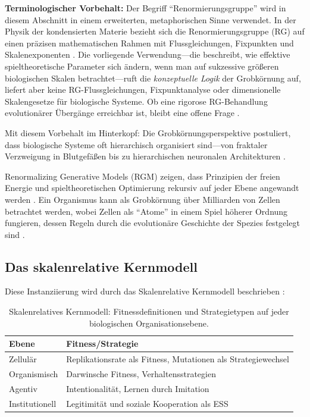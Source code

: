 \documentclass[12pt,a4paper]{article}
\theoremstyle{remark}
\begin{document}
\textbf{Terminologischer Vorbehalt:} Der Begriff ``Renormierungsgruppe'' wird in diesem Abschnitt in einem erweiterten, metaphorischen Sinne verwendet. In der Physik der kondensierten Materie bezieht sich die Renormierungsgruppe (RG) auf einen pr\"azisen mathematischen Rahmen mit Flussgleichungen, Fixpunkten und Skalenexponenten \citep{ScaleRGResearch}. Die vorliegende Verwendung---die beschreibt, wie effektive spieltheoretische Parameter sich \"andern, wenn man auf sukzessive gr\"o\ss{}eren biologischen Skalen betrachtet---ruft die \emph{konzeptuelle Logik} der Grobk\"ornung auf, liefert aber keine RG-Flussgleichungen, Fixpunktanalyse oder dimensionelle Skalengesetze f\"ur biologische Systeme. Ob eine rigorose RG-Behandlung evolution\"arer \"Uberg\"ange erreichbar ist, bleibt eine offene Frage \citep{ScaleRGFrontiers}.

Mit diesem Vorbehalt im Hinterkopf: Die Grobk\"ornungsperspektive postuliert, dass biologische Systeme oft hierarchisch organisiert sind---von fraktaler Verzweigung in Blutgef\"a\ss{}en bis zu hierarchischen neuronalen Architekturen \citep{SelfSimilarNetworks}.

Renormalizing Generative Models (RGM) zeigen, dass Prinzipien der freien Energie und spieltheoretischen Optimierung rekursiv auf jeder Ebene angewandt werden \citep{ScaleRGFrontiers}. Ein Organismus kann als Grobk\"ornung \"uber Milliarden von Zellen betrachtet werden, wobei Zellen als ``Atome'' in einem Spiel h\"oherer Ordnung fungieren, dessen Regeln durch die evolution\"are Geschichte der Spezies festgelegt sind \citep{ReplicatorOptimization}.

\subsection{Das skalenrelative Kernmodell}

Diese Instanziierung wird durch das Skalenrelative Kernmodell beschrieben \citep{ReplicatorOptimization}:

\begin{table}[htbp]
\centering
\caption{Skalenrelatives Kernmodell: Fitnessdefinitionen und Strategietypen auf jeder biologischen Organisationsebene.}
\label{tab:scale-kernel}
\begin{tabular}{ll}
\toprule
\textbf{Ebene} & \textbf{Fitness/Strategie} \\
\midrule
Zellul\"ar & Replikationsrate als Fitness, Mutationen als Strategiewechsel \\
Organismisch & Darwinsche Fitness, Verhaltensstrategien \\
Agentiv & Intentionalit\"at, Lernen durch Imitation \\
Institutionell & Legitimit\"at und soziale Kooperation als ESS \\
\bottomrule
\end{tabular}
\end{table}
\end{document}
